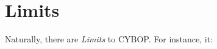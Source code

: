 %
%
%
%
%
%
%

\section{Limits}
\label{limits_heading}

Naturally, there are \emph{Limits} to CYBOP. For instance, it:

